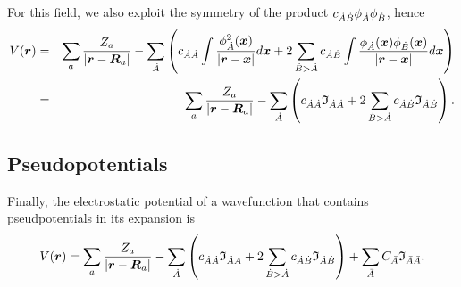 For this field, we also exploit the symmetry of the product $c_{\dot{A}\dot{B}}\phi_{\dot{A}}\phi_{\dot{B}}$, hence
%
\begin{eqnarray}
   V(\boldsymbol{r})&=&\sum_a\frac{Z_a}{|\boldsymbol{r}-\boldsymbol{R}_a|}-
   \sum_{\dot{A}}\left(c_{\dot{A}\dot{A}}\int\frac{\phi_{\dot{A}}^2(\boldsymbol{x})}{|\boldsymbol{r}-\boldsymbol{x}|}d\boldsymbol{x}+2\sum_{\dot{B}>\dot{A}}c_{\dot{A}\dot{B}}\int\frac{\phi_{\dot{A}}(\boldsymbol{x})\phi_{\dot{B}}(\boldsymbol{x})}{|\boldsymbol{r}-\boldsymbol{x}|}d\boldsymbol{x}\right)\nonumber\\
   &=&\sum_a\frac{Z_a}{|\boldsymbol{r}-\boldsymbol{R}_a|}-
   \sum_{\dot{A}}\left(c_{\dot{A}\dot{A}}\mathfrak{I}_{\dot{A}\dot{A}}+2\sum_{\dot{B}>\dot{A}}c_{\dot{A}\dot{B}}\mathfrak{I}_{\dot{A}\dot{B}}\right).
\end{eqnarray}
%

\subsection{Pseudopotentials}

Finally, the electrostatic potential of a wavefunction that contains pseudpotentials
in its expansion is
%
\begin{equation}%
  V(\boldsymbol{r})=\sum_a\frac{Z_a}{|\boldsymbol{r}-\boldsymbol{R}_a|}-
   \sum_{\dA}\left(c_{\dA\dA}\mathfrak{I}_{\dA\dA}+
   2\sum_{\dB>\dA}c_{\dA\dB}\mathfrak{I}_{\dA\dB}\right)+
   \sum_{\bA}C_{\bA}\mathfrak{I}_{\bA\bA}.
\end{equation}
%



